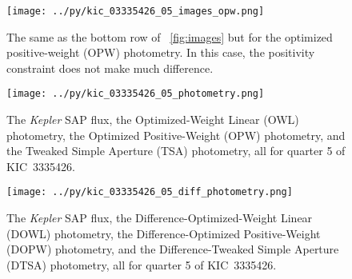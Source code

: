 \documentclass[12pt, letterpaper, preprint]{aastex}
\newcommand{\project}[1]{\textsl{#1}}
\begin{document}
\clearpage
\begin{figure}
\texttt{[image: ../py/kic\_03335426\_05\_images\_opw.png]}
\caption{
The same as the bottom row of \figurename~\ref{fig:images}
  but for the optimized positive-weight (OPW) photometry.
In this case, the positivity constraint does not make much difference.
\label{fig:images_opw}}
\end{figure}

\clearpage
\begin{figure}
\texttt{[image: ../py/kic\_03335426\_05\_photometry.png]}
\caption{
The \project{Kepler} SAP flux,
  the Optimized-Weight Linear (OWL) photometry,
  the Optimized Positive-Weight (OPW) photometry,
  and the Tweaked Simple Aperture (TSA) photometry,
  all for quarter 5 of KIC~3335426.
\label{fig:results}}
\end{figure}

\clearpage
\begin{figure}
\texttt{[image: ../py/kic\_03335426\_05\_diff\_photometry.png]}
\caption{
The \project{Kepler} SAP flux,
  the Difference-Optimized-Weight Linear (DOWL) photometry,
  the Difference-Optimized Positive-Weight (DOPW) photometry,
  and the Difference-Tweaked Simple Aperture (DTSA) photometry,
  all for quarter 5 of KIC~3335426.
\label{fig:dresults}}
\end{figure}
\end{document}
